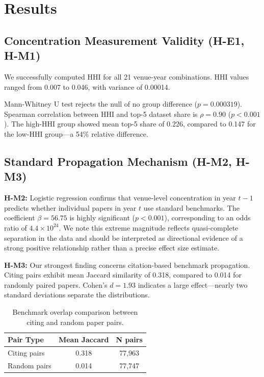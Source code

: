 \section{Results}

\subsection{Concentration Measurement Validity (H-E1, H-M1)}

We successfully computed HHI for all 21 venue-year combinations. HHI values ranged from 0.007 to 0.046, with variance of 0.00014.

Mann-Whitney U test rejects the null of no group difference ($p = 0.000319$). Spearman correlation between HHI and top-5 dataset share is $\rho = 0.90$ ($p < 0.001$). The high-HHI group showed mean top-5 share of 0.226, compared to 0.147 for the low-HHI group---a 54\% relative difference.

\subsection{Standard Propagation Mechanism (H-M2, H-M3)}

\textbf{H-M2:} Logistic regression confirms that venue-level concentration in year $t-1$ predicts whether individual papers in year $t$ use standard benchmarks. The coefficient $\beta = 56.75$ is highly significant ($p < 0.001$), corresponding to an odds ratio of $4.4 \times 10^{24}$. We note this extreme magnitude reflects quasi-complete separation in the data and should be interpreted as directional evidence of a strong positive relationship rather than a precise effect size estimate.

\textbf{H-M3:} Our strongest finding concerns citation-based benchmark propagation. Citing pairs exhibit mean Jaccard similarity of 0.318, compared to 0.014 for randomly paired papers. Cohen's $d = 1.93$ indicates a large effect---nearly two standard deviations separate the distributions.

\begin{table}[htbp]
\centering
\caption{Benchmark overlap comparison between citing and random paper pairs.}
\label{tab:jaccard}
\begin{tabular}{@{}lcc@{}}
\toprule
Pair Type & Mean Jaccard & N pairs \\
\midrule
Citing pairs & 0.318 & 77,963 \\
Random pairs & 0.014 & 77,747 \\
\bottomrule
\end{tabular}
\end{table}

